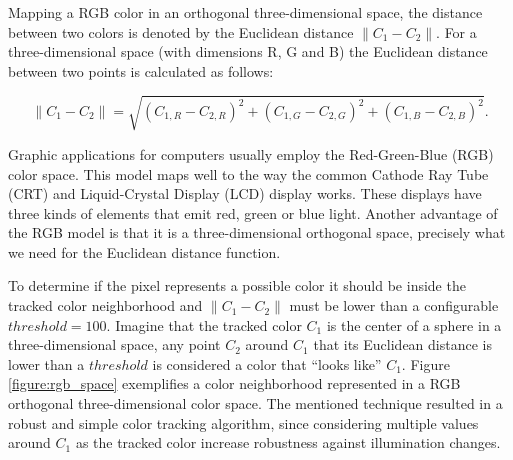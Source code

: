 Mapping a RGB color in an orthogonal three-dimensional space, the distance between two colors is denoted by the Euclidean distance $\|C_1-C_2\|$. For a three-dimensional space (with dimensions R, G and B) the Euclidean distance between two points is calculated as follows:

$$\|C_1-C_2\|=\sqrt{(C_{1,R}-C_{2,R})^2 + (C_{1,G}-C_{2,G})^2 + (C_{1,B}-C_{2,B})^2}.$$

Graphic applications for computers usually employ the Red-Green-Blue (RGB) color space. This model maps well to the way the common Cathode Ray Tube (CRT) and Liquid-Crystal Display (LCD) display works. These displays have three kinds of elements that emit red, green or blue light. Another advantage of the RGB model is that it is a three-dimensional orthogonal space, precisely what we need for the Euclidean distance function.

To determine if the pixel represents a possible color it should be inside the tracked color neighborhood and $\|C_1-C_2\|$ must be lower than a configurable $threshold=100$. Imagine that the tracked color $C_1$ is the center of a sphere in a three-dimensional space, any point $C_2$ around $C_1$ that its Euclidean distance is lower than a $threshold$ is considered a color that ``looks like'' $C_1$. Figure \ref{figure:rgb_space} exemplifies a color neighborhood represented in a RGB orthogonal three-dimensional color space. The mentioned technique resulted in a robust and simple color tracking algorithm, since considering multiple values around $C_1$ as the tracked color increase robustness against illumination changes.

